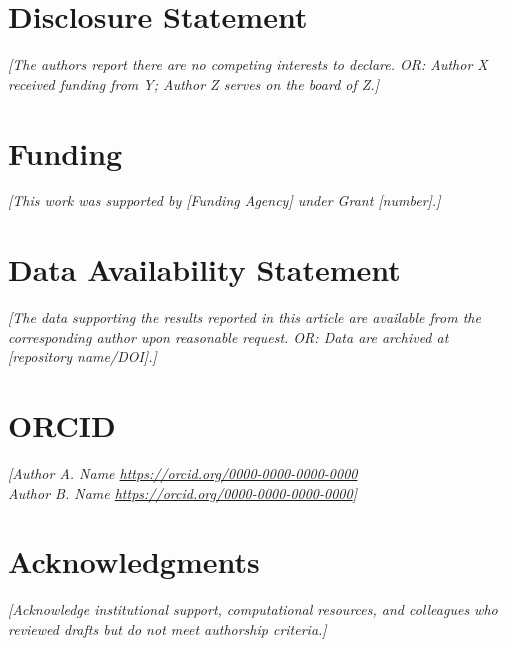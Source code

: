 \documentclass[10pt,twoside]{article}
\newcommand{\placeholder}[1]{%
  \textcolor{placeholder}{\textit{[#1]}}}
\begin{document}
\section*{Disclosure Statement}
\placeholder{The authors report there are no competing interests to declare.
  OR: Author X received funding from Y; Author Z serves on the board of Z.}

\section*{Funding}
\placeholder{This work was supported by [Funding Agency] under Grant [number].}

\section*{Data Availability Statement}
\placeholder{The data supporting the results reported in this article
  are available from the corresponding author upon reasonable request.
  OR: Data are archived at [repository name/DOI].}

\section*{ORCID}
\placeholder{Author A. Name \quad
  \url{https://orcid.org/0000-0000-0000-0000} \\
  Author B. Name \quad
  \url{https://orcid.org/0000-0000-0000-0000}}

\section*{Acknowledgments}
\placeholder{Acknowledge institutional support, computational resources,
  and colleagues who reviewed drafts but do not meet authorship criteria.}
\end{document}
